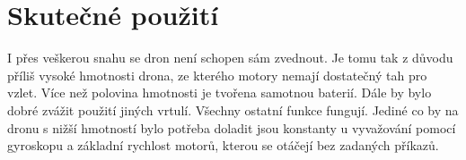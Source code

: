\newpage

\section{Skutečné použití}
     I přes veškerou snahu se dron není schopen sám zvednout. Je tomu tak z důvodu příliš vysoké hmotnosti drona, ze kterého motory nemají dostatečný tah pro vzlet. Více než polovina hmotnosti je tvořena samotnou baterií. Dále by bylo dobré zvážit použití jiných vrtulí. Všechny ostatní funkce fungují. Jediné co by na dronu s nižší hmotností bylo potřeba doladit jsou konstanty u vyvažování pomocí gyroskopu a základní rychlost motorů, kterou se otáčejí bez zadaných příkazů.